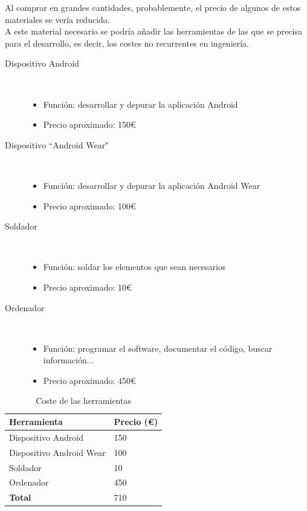 Al comprar en grandes cantidades, probablemente, el precio de algunos de estos
materiales se vería reducido.\\

A este material necesario se podría añadir las herramientas de las que se precisa
para el desarrollo, es decir, los costes no recurrentes en ingeniería.\\

\begin{description}
  \item [Dispositivo Android]\hfill \\
    \begin{itemize}
      \item {Función: desarrollar y depurar la aplicación Android}
      \item {Precio aproximado: 150\euro}
    \end{itemize}
  \item [Dispositivo ``Android Wear"]\hfill \\
    \begin{itemize}
      \item {Función: desarrollar y depurar la aplicación Android Wear}
      \item {Precio aproximado: 100\euro}
    \end{itemize}
  \item [Soldador]\hfill \\
    \begin{itemize}
      \item {Función: soldar los elementos que sean necesarios}
      \item {Precio aproximado: 10\euro}
    \end{itemize}
    \item [Ordenador]\hfill \\
      \begin{itemize}
        \item {Función: programar el software, documentar el código, buscar información...}
        \item {Precio aproximado: 450\euro}
      \end{itemize}
\end{description}

\begin{table}[h]
\centering
\begin{tabular}{ll}
\hline
\rowcolor[HTML]{9698ED}
{\bf Herramienta}        & {\bf Precio (\euro)} \\ \hline
Dispositivo Android      & 150                  \\
Dispositivo Android Wear & 100                  \\
Soldador                 & 10                   \\
Ordenador                & 450                  \\
\rowcolor[HTML]{CBCEFB}
{\bf Total}              & 710                  \\ \hline
\end{tabular}
\caption{Coste de las herramientas}
\label{costedelasherramientas}
\end{table}


